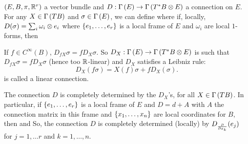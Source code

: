 \documentclass[main.tex]{subfiles}
\begin{document}
 $(E, B, \pi, \mathbb{R}^r)$ a vector bundle and $D: \Gamma\left( E \right) \to \Gamma\left( T^*B \otimes E \right)$ a connection on $E$. For any $X \in \Gamma\left( TB \right)$ and $\sigma \in \Gamma\left( E \right)$, we can define
where if, locally, $D(\sigma) = \sum_{i} \omega_i \otimes e_i$ where $\left\{e_1, \dots, e_r\right\}$ is a local frame of $E$ and $\omega_i$ are local $1$-forms, then

\begin{note}
If $f \in C^\infty(B)$, $D_{fX}\sigma = fD_X\sigma$. So $D_X : \Gamma\left( E \right) \to \Gamma\left( T^*B \otimes E \right)$ is such that $D_{fX}\sigma = f D_X\sigma$ (hence too $\mathbb{R}$-linear) and $D_X$ satisfies a Leibniz rule:
\[
D_X(f\sigma) = X(f)\sigma + fD_X(\sigma).
\]
 is called a linear connection.
\end{note}

\begin{note}
The connection $D$ is completely determined by the $D_X$'s, for all $X \in \Gamma\left( TB \right)$. In particular, if $\left\{e_1, \dots, e_r\right\}$ is a local frame of $E$ and $D = d + A$ with $A$ the connection matrix in this frame and $\left\{x_1, \dots, x_n\right\}$ are local coordinates for $B$, then
 and
So, the connection $D$ is completely determined (locally) by $D_{\frac{ \partial  }{ \partial x_k }}(e_j)$ for $j = 1, \dots r$ and $k = 1,\dots, n$.
\end{note}
\end{document}
